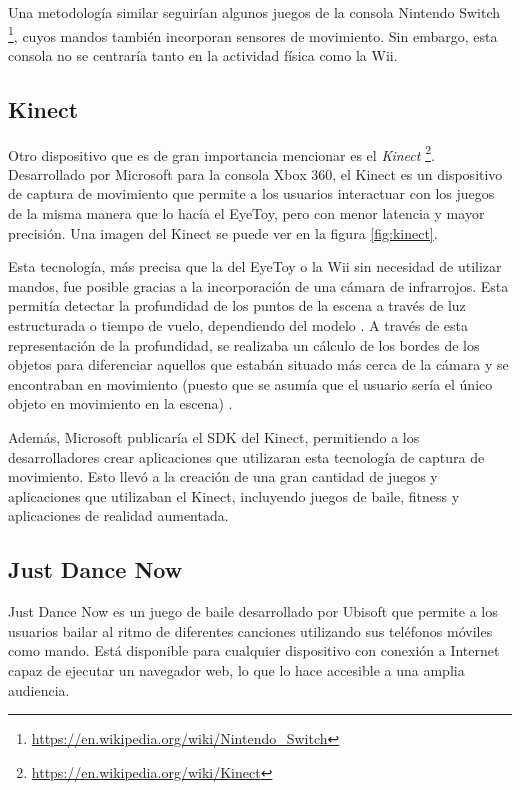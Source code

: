 
Una metodología similar seguirían algunos juegos de la consola Nintendo Switch%
\footnote{\url{https://en.wikipedia.org/wiki/Nintendo_Switch}}, cuyos mandos
también incorporan sensores de movimiento. Sin embargo, esta consola no se
centraría tanto en la actividad física como la Wii.

\subsection{Kinect}
\label{subsec:kinect}
Otro dispositivo que es de gran importancia mencionar es el \textit{Kinect}%
\footnote{\url{https://en.wikipedia.org/wiki/Kinect}}. Desarrollado por
Microsoft para la consola Xbox 360, el Kinect es un dispositivo de captura de
movimiento que permite a los usuarios interactuar con los juegos de la misma
manera que lo hacía el EyeToy, pero con menor latencia y mayor precisión.  Una
imagen del Kinect se puede ver en la figura \ref{fig:kinect}.


Esta tecnología, más precisa que la del EyeToy o la Wii sin necesidad de
utilizar mandos, fue posible gracias a la incorporación de una cámara de
infrarrojos. Esta permitía detectar la profundidad de los puntos de la escena a
través de luz estructurada o tiempo de vuelo, dependiendo del modelo
\parencite{sarbolandi2015kinect}. A través de esta representación de la
profundidad, se realizaba un cálculo de los bordes de los objetos para
diferenciar aquellos que estabán situado más cerca de la cámara y se encontraban
en movimiento (puesto que se asumía que el usuario sería el único objeto en
movimiento en la escena) \parencite{HowYouBecometheController}.

Además, Microsoft publicaría el SDK del Kinect, permitiendo a los
desarrolladores crear aplicaciones que utilizaran esta tecnología de captura de
movimiento. Esto llevó a la creación de una gran cantidad de juegos y
aplicaciones que utilizaban el Kinect, incluyendo juegos de baile, fitness y
aplicaciones de realidad aumentada.

\subsection{Just Dance Now}
\label{subsec:just-dance-now}
Just Dance Now es un juego de baile desarrollado por Ubisoft que permite a los
usuarios bailar al ritmo de diferentes canciones utilizando sus teléfonos
móviles como mando. Está disponible para cualquier dispositivo con conexión a
Internet capaz de ejecutar un navegador web, lo que lo hace accesible a una
amplia audiencia.

